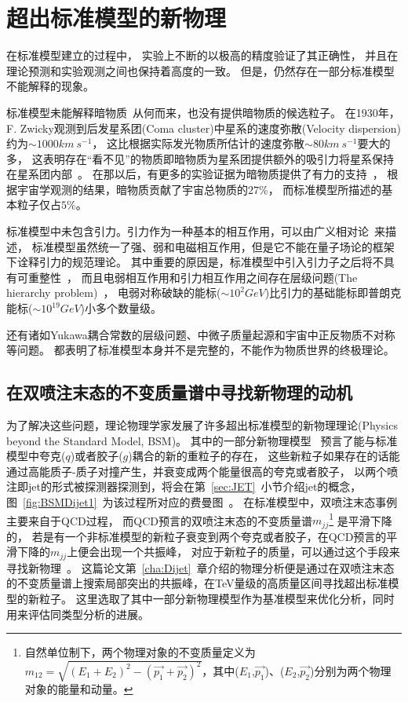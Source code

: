 \section{超出标准模型的新物理}
\label{sec:BSM}

在标准模型建立的过程中，
实验上不断的以极高的精度验证了其正确性，
并且在理论预测和实验观测之间也保持着高度的一致。
但是，仍然存在一部分标准模型不能解释的现象。

标准模型未能解释暗物质~\cite{DARKMATTER1}从何而来，也没有提供暗物质的候选粒子。
在1930年，F. Zwicky观测到后发星系团(Coma cluster)中星系的速度弥散(Velocity dispersion)约为$\sim 1000km~s^{-1}$，
这比根据实际发光物质所估计的速度弥散$\sim 80 km~s^{-1}$要大的多，
这表明存在“看不见”的物质即暗物质为星系团提供额外的吸引力将星系保持在星系团内部~\cite{DARKMATTER2}。
在那以后，有更多的实验证据为暗物质提供了有力的支持~\cite{DARKMATTER1}，
根据宇宙学观测的结果，暗物质贡献了宇宙总物质的$27\%$，
而标准模型所描述的基本粒子仅占$5\%$。

标准模型中未包含引力。引力作为一种基本的相互作用，可以由广义相对论~\cite{GRE}来描述，
标准模型虽然统一了强、弱和电磁相互作用，但是它不能在量子场论的框架下诠释引力的规范理论。
其中重要的原因是，标准模型中引入引力子之后将不具有可重整性~\cite{GRE1}，
而且电弱相互作用和引力相互作用之间存在层级问题(The hierarchy problem)~\cite{HP}，
电弱对称破缺的能标($\sim 10^{2}GeV$)比引力的基础能标即普朗克能标($\sim 10^{19}GeV$)小多个数量级。

还有诸如Yukawa耦合常数的层级问题、中微子质量起源和宇宙中正反物质不对称等问题。
都表明了标准模型本身并不是完整的，不能作为物质世界的终极理论。



\subsection{在双喷注末态的不变质量谱中寻找新物理的动机}
\label{sec:BSMDijet}

为了解决这些问题，理论物理学家发展了许多超出标准模型的新物理理论(Physics beyond the Standard Model, BSM)。
其中的一部分新物理模型~\cite{qstar1,qstar2,zprime1,zprime3,wprime1,Chizhov:2009fc,Chizhov:2010jg,DM1,DM2,DM3,qbh1,qbh2,RS1,RS2,ADD}
预言了能与标准模型中夸克($q$)或者胶子($g$)耦合的新的重粒子的存在，
这些新粒子如果存在的话能通过高能质子-质子对撞产生，并衰变成两个能量很高的夸克或者胶子，
以两个喷注即jet的形式被探测器探测到，将会在第~\ref{sec:JET}~小节介绍jet的概念，
图~\ref{fig:BSMDijet1}~为该过程所对应的费曼图~\cite{FEYNR}。
在标准模型中，双喷注末态事例主要来自于QCD过程，
而QCD预言的双喷注末态的不变质量谱$m_{jj}
$\footnote{自然单位制下，两个物理对象的不变质量定义为$m_{12}=\sqrt{(E_1+E_2)^2-(\vec{p_1}+\vec{p_2})^2}$，其中($E_1$,$\vec{p_1}$)、($E_2$,$\vec{p_2}$)分别为两个物理对象的能量和动量。}
是平滑下降的，
若是有一个非标准模型的新粒子衰变到两个夸克或者胶子，在QCD预言的平滑下降的$m_{jj}$上便会出现一个共振峰，
对应于新粒子的质量，可以通过这个手段来寻找新物理~\cite{UA3}。
这篇论文第~\ref{cha:Dijet}~章介绍的物理分析便是通过在双喷注末态的不变质量谱上搜索局部突出的共振峰，在TeV量级的高质量区间寻找超出标准模型的新粒子。
这里选取了其中一部分新物理模型作为基准模型来优化分析，同时用来评估同类型分析的进展。


